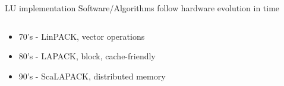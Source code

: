 \begin{frame}{LU implementation}
Software/Algorithms follow hardware evolution in time
  \begin{columns}[c]
    \begin{column}{0.60\textwidth}
      \begin{itemize}
      \item<1-> 70's - LinPACK, vector operations
      \item<2-> 80's - LAPACK, block, cache-friendly
      \item<3-> 90's - ScaLAPACK, distributed memory
      \end{itemize}
    \end{column}
    \begin{column}{0.35\textwidth}

\end{column}
\end{columns}
\end{frame}

